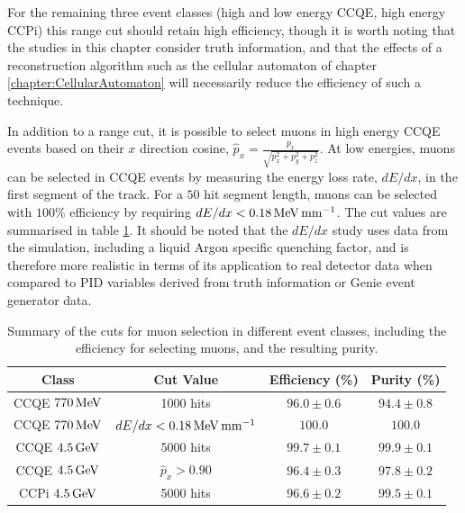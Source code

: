 For the remaining three event classes (high and low energy \acs{CCQE}, high energy \acs{CCPi}) this range cut should retain high efficiency, though it is worth noting that the studies in this chapter consider truth information, and that the effects of a reconstruction algorithm such as the cellular automaton of chapter \ref{chapter:CellularAutomaton} will necessarily reduce the efficiency of such a technique.

In addition to a range cut, it is possible to select muons in high energy \acs{CCQE} events based on their $x$ direction cosine, $\displaystyle \hat{p}_x = \frac{p_x}{\sqrt{p_x^2 + p_y^2 + p_z^2}}$. At low energies, muons can be selected in \acs{CCQE} events by measuring the energy loss rate, $dE/dx$, in the first segment of the track. For a $50$ hit segment length, muons can be selected with $100\%$ efficiency by requiring $dE/dx < 0.18 \,\mathrm{MeV} \,\mathrm{mm}^{-1}$. The cut values are summarised in table \ref{table:summary_cuts}. It should be noted that the $dE/dx$ study uses data from the simulation, including a liquid Argon specific quenching factor, and is therefore more realistic in terms of its application to real detector data when compared to \acs{PID} variables derived from truth information or Genie event generator data.

\begin{table}
\centering
\begin{tabular}{cccc}
    Class & Cut Value & Efficiency (\%) & Purity (\%) \\
\hline
\hline
\acs{CCQE} $770\,\mathrm{MeV}$ & 1000 hits & $96.0\pm0.6$ & $94.4\pm0.8$ \\
\acs{CCQE} $770\,\mathrm{MeV}$ & $dE/dx < 0.18 \,\mathrm{MeV} \,\mathrm{mm}^{-1}$ & $100.0$ & $100.0$ \\
\acs{CCQE} $4.5\,\mathrm{GeV}$ & 5000 hits & $99.7\pm0.1$ & $99.9\pm0.1$ \\
\acs{CCQE} $4.5\,\mathrm{GeV}$ & $\hat{p}_x > 0.90$ & $96.4\pm0.3$ & $97.8\pm0.2$ \\
\acs{CCPi} $4.5\,\mathrm{GeV}$ & 5000 hits & $96.6\pm0.2$ & $99.5\pm0.1$ \\
\hline 
\end{tabular}
\caption[Summary of cuts with efficiencies and purities]{\label{table:summary_cuts}Summary of the cuts for muon selection in different event classes, including the efficiency for selecting muons, and the resulting purity.}
\end{table}

